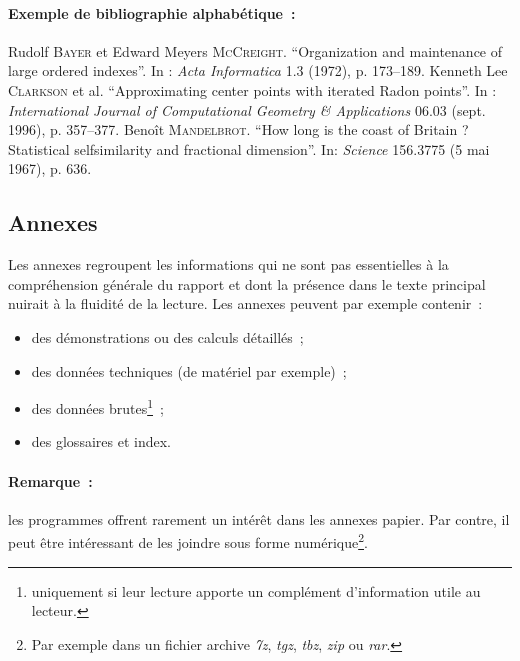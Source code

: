 \paragraph{Exemple de bibliographie alphabétique~:}
\begingroup
\renewcommand{\section}[2]{}%
\begin{thebibliography}{WWW99}
 Rudolf \textsc{Bayer} et Edward Meyers \textsc{McCreight}. ``Organization and
  maintenance of large ordered indexes''. In : \emph{Acta Informatica} 1.3
  (1972), p. 173--189.
 Kenneth Lee \textsc{Clarkson} et al. ``Approximating center points with
  iterated Radon points''. In : \emph{International Journal of
    Computational Geometry \& Applications} 06.03 (sept. 1996), p. 357--377.
 Benoît \textsc{Mandelbrot}. ``How long is the coast of Britain ?
  Statistical selfsimilarity and fractional dimension''. In: \emph{Science}
  156.3775 (5 mai 1967), p. 636.
\end{thebibliography}
\endgroup

\subsection{Annexes}

Les annexes regroupent les informations qui ne sont pas essentielles à la
compréhension générale du rapport et dont la présence dans le texte principal
nuirait à la fluidité de la lecture. Les annexes peuvent par exemple
contenir~:
\begin{itemize}
\item des démonstrations ou des calculs détaillés~;
\item des données techniques (de matériel par exemple)~;
\item des données brutes\footnote{uniquement si leur lecture apporte un
    complément d'information utile au lecteur.}~;
\item des glossaires et index.
\end{itemize}

\paragraph{Remarque~:} les programmes offrent rarement un intérêt dans les
annexes papier. Par contre, il peut être intéressant de les joindre sous forme
numérique\footnote{Par exemple dans un fichier archive \emph{7z}, \emph{tgz},
  \emph{tbz}, \emph{zip} ou \emph{rar}.}.

